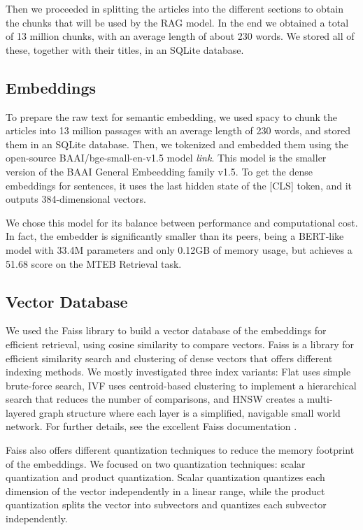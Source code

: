 \documentclass[11pt]{article}
\begin{document}
Then we proceeded in splitting the articles into the different sections to obtain the chunks 
that will be used by the RAG model. 
In the end we obtained a total of 13 million chunks, with an average length of about 230 words.
We stored all of these, together with their titles, in an SQLite database.

\subsection{Embeddings}

To prepare the raw text for semantic embedding, we used spacy to chunk the articles into 13 million passages with an average
length of 230 words, and stored them in an SQLite database. Then, we tokenized and embedded them using the open-source BAAI/bge-small-en-v1.5 model 
\textit{link}. This model is the smaller version of the BAAI General Embeedding family v1.5. 
To get the dense embeddings for sentences, it uses the last hidden state of the [CLS] token, and it outputs 
384-dimensional vectors.

We chose this model for its balance between performance and computational cost.
In fact, the embedder is significantly smaller than its peers, being a BERT-like model with 33.4M 
parameters and only 0.12GB of memory usage, but achieves a 51.68 score on the MTEB Retrieval task.

\subsection{Vector Database}

We used the Faiss library to build a vector database of the embeddings for efficient retrieval, using cosine similarity to compare vectors.
Faiss is a library for efficient similarity search and clustering of dense vectors that offers different indexing methods.
We mostly investigated three index variants: Flat uses simple brute-force search, IVF uses centroid-based clustering to 
implement a hierarchical search that reduces the number of comparisons, and HNSW creates a multi-layered graph structure 
where each layer is a simplified, navigable small world network. For further details, see the excellent Faiss documentation \cite{faiss}.

Faiss also offers different quantization techniques to reduce the memory footprint of the embeddings. We focused
on two quantization techniques: scalar quantization and product quantization. 
Scalar quantization quantizes each dimension of the vector independently in a linear
range, while the product quantization splits the vector into subvectors and quantizes each
subvector independently.
\end{document}
